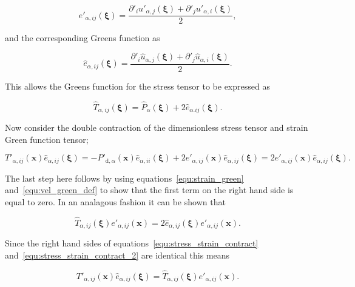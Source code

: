 \documentclass[12pt]{article}
\begin{document}
\begin{equation}
\label{equ:dimles_strain}
e'_{\alpha,ij}(\boldsymbol{\xi}) = \frac{\partial'_{i} u'_{\alpha,j}(\boldsymbol{\xi}) + \partial'_{j} u'_{\alpha,i}(\boldsymbol{\xi})}{2} ,
\end{equation}


and the corresponding Greens function as

\begin{equation}
\label{equ:strain_green}
\hat{e}_{\alpha,ij}(\boldsymbol{\xi}) = \frac{\partial'_{i} \hat{u}_{\alpha,j}(\boldsymbol{\xi}) + \partial'_{j} \hat{u}_{\alpha,i}(\boldsymbol{\xi})}{2} .
\end{equation}

This allows the Greens function for the stress tensor to be expressed as

\begin{equation}
\label{equ:stress_with_strain}
\hat{T}_{\alpha,ij}(\boldsymbol{\xi}) = \hat{P}_{\alpha}(\boldsymbol{\xi}) + 2 \hat{e}_{\alpha.ij}(\boldsymbol{\xi}).
\end{equation}

Now consider the double contraction of the dimensionless stress tensor and strain Green function tensor;

\begin{equation}
\label{equ:stress_strain_contract}
T'_{\alpha,ij}(\boldsymbol{x}) \hat{e}_{\alpha,ij}(\boldsymbol{\xi}) = -P'_{\text{d},\alpha}(\boldsymbol{x}) \hat{e}_{\alpha,ii}(\boldsymbol{\xi}) + 2 e'_{\alpha,ij}(\boldsymbol{x}) \hat{e}_{\alpha,ij}(\boldsymbol{\xi}) = 2 e'_{\alpha,ij}(\boldsymbol{x}) \hat{e}_{\alpha,ij}(\boldsymbol{\xi}).
\end{equation}

The last step here follows by using equations~\ref{equ:strain_green} and~\ref{equ:vel_green_def} to show that the first term on the right hand side is equal to zero. In an analagous fashion it can be shown that

\begin{equation}
\label{equ:stress_strain_contract_2}
\hat{T}_{\alpha,ij}(\boldsymbol{\xi}) e'_{\alpha,ij}(\boldsymbol{x}) = 2 \hat{e}_{\alpha,ij}(\boldsymbol{\xi}) e'_{\alpha,ij}(\boldsymbol{x}).
\end{equation}

Since the right hand sides of equations~\ref{equ:stress_strain_contract} and~\ref{equ:stress_strain_contract_2} are identical this means

\begin{equation}
\label{equ:stress_strain_recip}
T'_{\alpha,ij}(\boldsymbol{x}) \hat{e}_{\alpha,ij}(\boldsymbol{\xi}) = \hat{T}_{\alpha,ij}(\boldsymbol{\xi}) e'_{\alpha,ij}(\boldsymbol{x}).
\end{equation}
\end{document}
